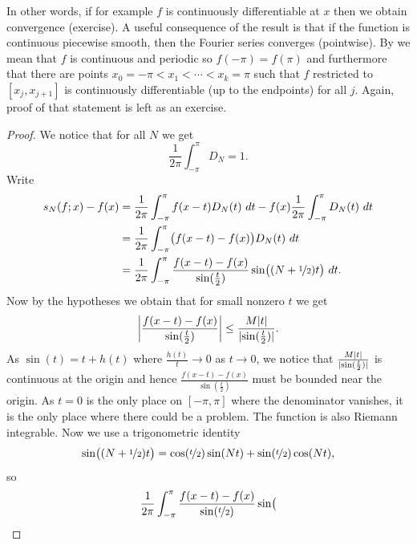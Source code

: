 In other words, if for example $f$ is continuously
differentiable at $x$
then we obtain convergence (exercise).  A useful consequence of
the result is
that if the function is continuous
piecewise smooth, then the Fourier series converges
(pointwise). 
By \emph{}
we mean that $f$
is continuous and periodic so $f(-\pi) = f(\pi)$ and furthermore
that there are points $x_0 = -\pi < x_1 < \cdots < x_k = \pi$
such that $f$ restricted to $[x_j,x_{j+1}]$
is continuously differentiable (up to the endpoints) for all $j$.
Again, proof of that statement is left as an exercise.

\begin{proof}
We notice that for all $N$ we get
\begin{equation*}
\frac{1}{2\pi} \int_{-\pi}^\pi D_N = 1 .
\end{equation*}
Write
\begin{equation*}
\begin{split}
s_N(f;x)-f(x) & =
\frac{1}{2\pi} \int_{-\pi}^\pi f(x-t) D_N(t) ~ dt 
-
f(x)
\frac{1}{2\pi} \int_{-\pi}^\pi D_N(t) ~ dt
\\
& = 
\frac{1}{2\pi} \int_{-\pi}^\pi \bigl( f(x-t) - f(x) \bigr) D_N(t) ~ dt 
\\
& = 
\frac{1}{2\pi} \int_{-\pi}^\pi \frac{f(x-t) - f(x)}{\sin(\frac{t}{2})} \sin\bigl(
(N+\nicefrac{1}{2})t \bigr) ~ dt .
\end{split}
\end{equation*}
Now by the hypotheses we obtain that
for small nonzero $t$ we get
\begin{equation*}
\left\lvert { \frac{f(x-t) - f(x)}{\sin(\frac{t}{2})} } \right\rvert
\leq
\frac{M\lvert {t} \rvert}{\lvert {\sin(\frac{t}{2})} \rvert} .
\end{equation*}
As $\sin(t) = t + h(t)$ where $\frac{h(t)}{t} \to 0$ as $t \to 0$,
we notice that
$\frac{M\lvert {t} \rvert}{\lvert {\sin(\frac{t}{2})} \rvert}$ is continuous at the origin
and hence 
$\frac{f(x-t) - f(x)}{\sin(\frac{t}{2})}$ must be bounded near the origin.
As $t=0$ is the only place on $[-\pi,\pi]$ where the denominator vanishes,
it is the only place where there could be a problem.  The function is
also Riemann integrable.  Now we use a trigonometric identity
\begin{equation*}
\sin\bigl( (N+\nicefrac{1}{2})t \bigr)
=
\cos(\nicefrac{t}{2}) \sin(Nt) + 
\sin(\nicefrac{t}{2}) \cos(Nt) ,
\end{equation*}
so
\begin{multline*}
\frac{1}{2\pi} \int_{-\pi}^\pi \frac{f(x-t) - f(x)}{\sin(\nicefrac{t}{2})} \sin\bigl(

\end{multline*}
\end{proof}
